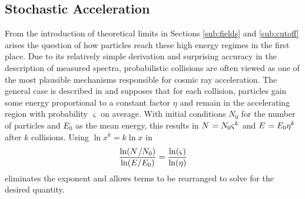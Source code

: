 \subsection{Stochastic Acceleration}
\label{sub:acceleration}

From the introduction of theoretical limits in Sections \ref{sub:fields} and \ref{sub:cutoff} arises the question of how
particles reach these high energy regimes in the first place. Due to its relatively simple derivation and surprising accuracy
in the description of measured spectra, probabilistic collisions are often viewed as one of the most plausible mechanisms
responsible for cosmic ray acceleration. The general case is described in \cite{Longair_2011} and supposes that for each
collision, particles gain some energy proportional to a constant factor $\eta$ and remain in the accelerating region with
probability $\varsigma$ on average. With initial conditions $N_0$ for the number of particles and $E_0$ as the mean
energy, this results in $N \kern+0.9pt = N_0 \varsigma^k$ and $E \kern+0.9pt = E_0 \eta^k$ after $k$ collisions. Using
$\ln x^k = k\ln x$ in
\begin{equation}
	\frac{\ln (N \kern+1.0pt / N_0)}{\ln (E / E_0)} = \frac{\ln(\varsigma)}{\ln(\eta)}
\end{equation}
eliminates the exponent and allows terms to be rearranged to solve for the desired quantity.

\enlargethispage*{\baselineskip}\newpage

